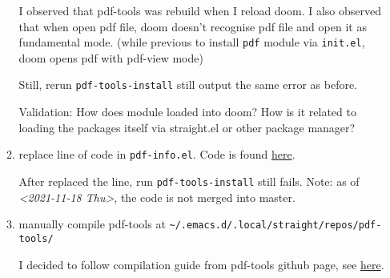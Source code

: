\documentclass[11pt]{article}
\begin{document}
\begin{enumerate}
\begin{enumerate}
I observed that pdf-tools was rebuild when I reload doom.
I also observed that when open pdf file, doom doesn't recognise pdf file and open it as fundamental mode. (while previous to install \texttt{pdf} module via \texttt{init.el}, doom opens pdf with pdf-view mode)

Still, rerun \texttt{pdf-tools-install} still output the same error as before.

Validation: How does module loaded into doom? How is it related to loading the packages itself via straight.el or other package manager?

\item replace line of code in \texttt{pdf-info.el}. Code is found \href{https://github.com/politza/pdf-tools/pull/683/commits/90852ba946c1a798f0b7b4dd412bf9d616c8cecf}{here}.
\label{sec:orga4a582f}

After replaced the line, run \texttt{pdf-tools-install} still fails.
Note: as of \textit{<2021-11-18 Thu>}, the code is not merged into master.

\item manually compile pdf-tools at \texttt{\textasciitilde{}/.emacs.d/.local/straight/repos/pdf-tools/}
\label{sec:org9d8c3f3}

I decided to follow compilation guide from pdf-tools github page, see \href{https://github.com/politza/pdf-tools\#compilation}{here}.


\end{enumerate}
\end{enumerate}
\end{document}
